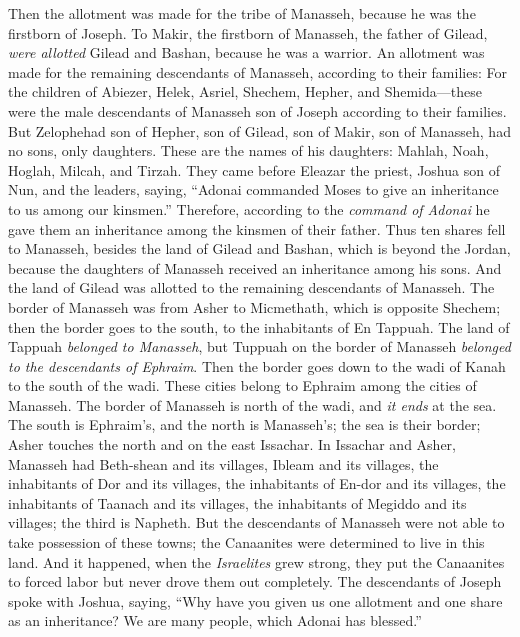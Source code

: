 \begin{biblechapter} %
 Then the allotment was made for the tribe of Manasseh, because he was the firstborn of Joseph. To Makir, the firstborn of Manasseh, the father of Gilead, \textit{were allotted} Gilead and Bashan, because he was a warrior.
\verse An allotment was made for the remaining descendants of Manasseh, according to their families: For the children of Abiezer, Helek, Asriel, Shechem, Hepher, and Shemida—these were the male descendants of Manasseh son of Joseph according to their families.
\verse But Zelophehad son of Hepher, son of Gilead, son of Makir, son of Manasseh, had no sons, only daughters. These are the names of his daughters: Mahlah, Noah, Hoglah, Milcah, and Tirzah.
\verse They came before Eleazar the priest, Joshua son of Nun, and the leaders, saying, “Adonai commanded Moses to give an inheritance to us among our kinsmen.” Therefore, according to the \textit{command of Adonai} he gave them an inheritance among the kinsmen of their father.
\verse Thus ten shares fell to Manasseh, besides the land of Gilead and Bashan, which is beyond the Jordan,
\verse because the daughters of Manasseh received an inheritance among his sons. And the land of Gilead was allotted to the remaining descendants of Manasseh.
\verse The border of Manasseh was from Asher to Micmethath, which is opposite Shechem; then the border goes to the south, to the inhabitants of En Tappuah.
\verse The land of Tappuah \textit{belonged to Manasseh}, but Tuppuah on the border of Manasseh \textit{belonged to the descendants of Ephraim}.
\verse Then the border goes down to the wadi of Kanah to the south of the wadi. These cities belong to Ephraim among the cities of Manasseh. The border of Manasseh is north of the wadi, and \textit{it ends} at the sea.
\verse The south is Ephraim’s, and the north is Manasseh’s; the sea is their border; Asher touches the north and on the east Issachar.
\verse In Issachar and Asher, Manasseh had Beth-shean and its villages, Ibleam and its villages, the inhabitants of Dor and its villages, the inhabitants of En-dor and its villages, the inhabitants of Taanach and its villages, the inhabitants of Megiddo and its villages; the third is Napheth.
\verse But the descendants of Manasseh were not able to take possession of these towns; the Canaanites were determined to live in this land.
\verse And it happened, when the \textit{Israelites} grew strong, they put the Canaanites to forced labor but never drove them out completely.
 The descendants of Joseph spoke with Joshua, saying, “Why have you given us one allotment and one share as an inheritance? We are many people, which Adonai has blessed.”

\end{biblechapter}
